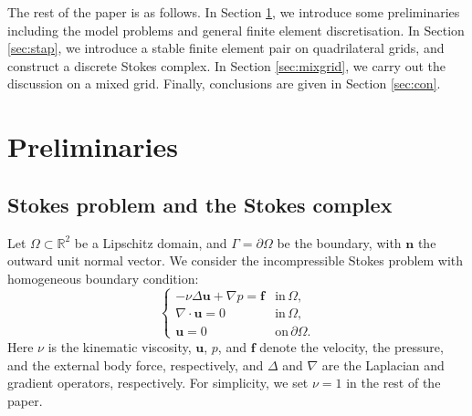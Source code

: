\documentclass[12pt,showkeys]{amsart}
\begin{document}
The rest of the paper is as follows. In Section \ref{sec:pre}, we introduce some preliminaries including the model problems and general finite element discretisation. In Section \ref{sec:stap}, we introduce a stable finite element pair on quadrilateral grids, and construct a discrete Stokes complex. In Section \ref{sec:mixgrid}, we carry out the discussion on a mixed grid. Finally, conclusions are given in Section \ref{sec:con}. 

\section{Preliminaries}
\label{sec:pre}

\subsection{Stokes problem and the Stokes complex}

Let $\Omega\subset\mathbb{R}^2$ be a Lipschitz domain, and $\Gamma=\partial\Omega$ be the boundary, with $\mathbf{n}$ the outward unit normal vector. We consider the incompressible Stokes problem with homogeneous boundary condition:
\begin{equation}\label{eq:stokesbvp}
\left\{\begin{array}{rl}
-\nu\Delta\mathbf{u}+\nabla p=\mathbf{f} & \mbox{in}\,\Omega, \\
\nabla\cdot\mathbf{u}=0 &\mbox{in}\,\Omega, \\
\mathbf{u}=0 &\mbox{on}\,\partial\Omega.
\end{array}
\right.
\end{equation}
Here $\nu$ is the kinematic viscosity, $\mathbf{u}$, $p$, and $\mathbf{f}$ denote the velocity, the pressure, and the external body force, respectively, and $\Delta$ and $\nabla$ are the Laplacian and gradient operators, respectively. For simplicity, we set $\nu=1$ in the rest of the paper.  
\end{document}

